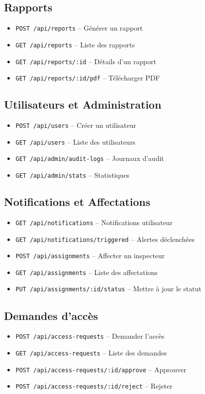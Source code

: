 \documentclass[12pt,a4paper]{article}
\begin{document}
\subsection{Rapports}
\begin{itemize}
    \item \texttt{POST /api/reports} -- Générer un rapport
    \item \texttt{GET /api/reports} -- Liste des rapports
    \item \texttt{GET /api/reports/:id} -- Détails d'un rapport
    \item \texttt{GET /api/reports/:id/pdf} -- Télécharger PDF
\end{itemize}

\subsection{Utilisateurs et Administration}
\begin{itemize}
    \item \texttt{POST /api/users} -- Créer un utilisateur
    \item \texttt{GET /api/users} -- Liste des utilisateurs
    \item \texttt{GET /api/admin/audit-logs} -- Journaux d'audit
    \item \texttt{GET /api/admin/stats} -- Statistiques
\end{itemize}

\subsection{Notifications et Affectations}
\begin{itemize}
    \item \texttt{GET /api/notifications} -- Notifications utilisateur
    \item \texttt{GET /api/notifications/triggered} -- Alertes déclenchées
    \item \texttt{POST /api/assignments} -- Affecter un inspecteur
    \item \texttt{GET /api/assignments} -- Liste des affectations
    \item \texttt{PUT /api/assignments/:id/status} -- Mettre à jour le statut
\end{itemize}

\subsection{Demandes d'accès}
\begin{itemize}
    \item \texttt{POST /api/access-requests} -- Demander l'accès
    \item \texttt{GET /api/access-requests} -- Liste des demandes
    \item \texttt{POST /api/access-requests/:id/approve} -- Approuver
    \item \texttt{POST /api/access-requests/:id/reject} -- Rejeter
\end{itemize}
\end{document}
